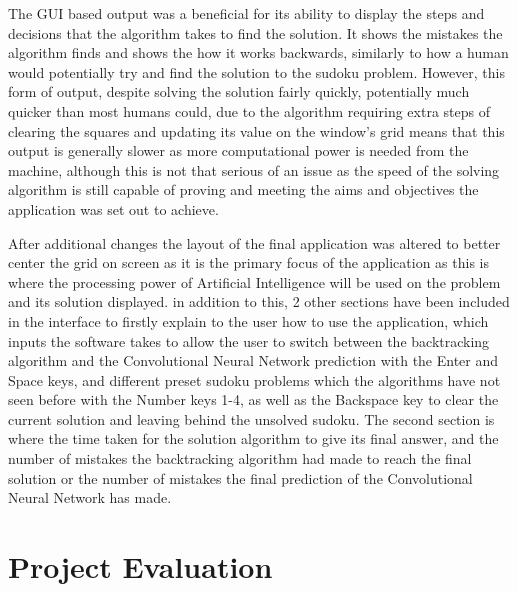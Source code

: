 \documentclass[]{final_report}
\begin{document}
\clearpage
The GUI based output was a beneficial for its ability to display the steps and decisions that the algorithm takes to find the solution. It shows the mistakes the algorithm finds and shows the how it works backwards, similarly to how a human would potentially try and find the solution to the sudoku problem. However, this form of output, despite solving the solution fairly quickly, potentially much quicker than most humans could, due to the algorithm requiring extra steps of clearing the squares and updating its value on the window’s grid means that this output is generally slower as more computational power is needed from the machine, although this is not that serious of an issue as the speed of the solving algorithm is still capable of proving and meeting the aims and objectives the application was set out to achieve. 

After additional changes the layout of the final application was altered to better center the grid on screen as it is the primary focus of the application as this is where the processing power of Artificial Intelligence will be used on the problem and its solution displayed. in addition to this, 2 other sections have been included in the interface to firstly explain to the user how to use the application, which inputs the software takes to allow the user to switch between the backtracking algorithm and the Convolutional Neural Network prediction with the Enter and Space keys, and different preset sudoku problems which the algorithms have not seen before with the Number keys 1-4, as well as the Backspace key to clear the current solution and leaving behind the unsolved sudoku. The second section is where the time taken for the solution algorithm to give its final answer, and the number of mistakes the backtracking algorithm had made to reach the final solution or the number of mistakes the final prediction of the Convolutional Neural Network has made. 

\chapter{Project Evaluation}
\end{document}
